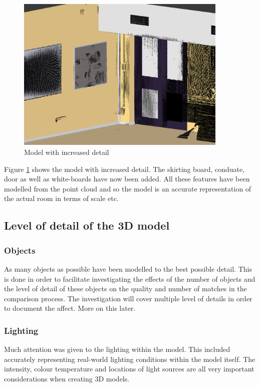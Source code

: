\documentclass[11pt,a4paper]{report}
\begin{document}
				\begin{figure}[H]
					\centering
					\includegraphics[width=0.9\textwidth]{model_with_increased_detail}
					\caption{Model with increased detail}
					\label{fig:more_complex_model}
				\end{figure}
				
				Figure \ref{fig:more_complex_model} shows the model with increased detail. The skirting board, conduate, door as well as white-boards have now been added. All these features have been modelled from the point cloud and so the model is an accurate representation of the actual room in terms of scale etc.
				
		\subsection{Level of detail of the 3D model}
			\subsubsection{Objects}
				As many objects as possible have been modelled to the best possible detail. This is done in order to facilitate investigating the effects of the number of objects and the level of detail of these objects on the quality and number of matches in the comparison process. The investigation will cover multiple level of details in order to document the affect. More on this later.
			\subsubsection{Lighting}
				Much attention was given to the lighting within the model. This included accurately representing real-world lighting conditions within the model itself. The intensity, colour temperature and locations of light sources are all very important considerations when creating 3D models.
				
\end{document}
